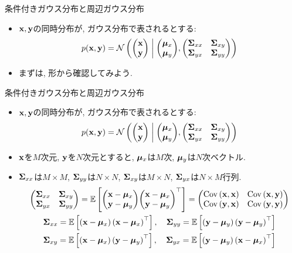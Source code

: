 \documentclass[dvipdfmx,notheorems,t]{beamer}
\begin{document}
\begin{frame}{条件付きガウス分布と周辺ガウス分布}
\begin{itemize}
  \item $\vb{x}, \vb{y}$の同時分布が, ガウス分布で表されるとする:
  \begin{align*}
    p(\vb{x}, \vb{y}) = \mathcal{N} \left( \mqty(\vb{x} \\ \vb{y}) \middlerel|
      \mqty(\vb*{\mu}_x \\ \vb*{\mu}_y),
      \mqty(\vb{\Sigma}_{xx} & \vb{\Sigma}_{xy} \\
        \vb{\Sigma}_{yx} & \vb{\Sigma}_{yy}) \right)
  \end{align*}
  \item まずは, 形から確認してみよう.
\end{itemize}
\end{frame}

\begin{frame}{条件付きガウス分布と周辺ガウス分布}
\begin{itemize}
  \item $\vb{x}, \vb{y}$の同時分布が, ガウス分布で表されるとする:
  \begin{align*}
    p(\vb{x}, \vb{y}) = \mathcal{N} \left( \mqty(\vb{x} \\ \vb{y}) \middlerel|
      \mqty(\vb*{\mu}_x \\ \vb*{\mu}_y),
      \mqty(\vb{\Sigma}_{xx} & \vb{\Sigma}_{xy} \\
        \vb{\Sigma}_{yx} & \vb{\Sigma}_{yy}) \right)
  \end{align*}
  \item $\vb{x}$を$M$次元, $\vb{y}$を$N$次元とすると, $\vb*{\mu}_x$は$M$次, $\vb*{\mu}_y$は$N$次ベクトル.
  \item $\vb{\Sigma}_{xx}$は$M \times M$, $\vb{\Sigma}_{yy}$は$N \times N$,
  $\vb{\Sigma}_{xy}$は$M \times N$, $\vb{\Sigma}_{yx}$は$N \times M$行列.
  {\small \begin{gather*}
    \mqty(\vb{\Sigma}_{xx} & \vb{\Sigma}_{xy} \\
      \vb{\Sigma}_{yx} & \vb{\Sigma}_{yy})
      = \E{\mqty(\vb{x} - \vb*{\mu}_x \\ \vb{y} - \vb*{\mu}_y)
      \mqty(\vb{x} - \vb*{\mu}_x \\ \vb{y} - \vb*{\mu}_y)^\top}
      = \mqty(\Cov{\vb{x}}{\vb{x}} & \Cov{\vb{x}}{\vb{y}} \\
        \Cov{\vb{y}}{\vb{x}} & \Cov{\vb{y}}{\vb{y}}) \\
    \vb{\Sigma}_{xx} = \E{\left( \vb{x} - \vb*{\mu}_x \right) \left( \vb{x} - \vb*{\mu}_x \right)^\top}, \quad
    \vb{\Sigma}_{yy} = \E{\left( \vb{y} - \vb*{\mu}_y \right) \left( \vb{y} - \vb*{\mu}_y \right)^\top} \\
    \vb{\Sigma}_{xy} = \E{\left( \vb{x} - \vb*{\mu}_x \right) \left( \vb{y} - \vb*{\mu}_y \right)^\top}, \quad
    \vb{\Sigma}_{yx} = \E{\left( \vb{y} - \vb*{\mu}_y \right) \left( \vb{x} - \vb*{\mu}_x \right)^\top}
  \end{gather*}}
\end{itemize}
\end{frame}
\end{document}
